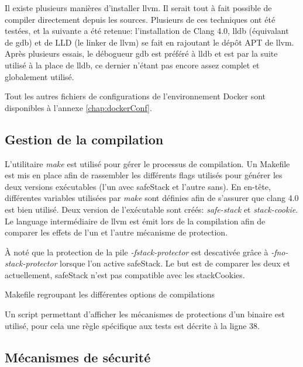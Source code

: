 Il existe plusieurs manières d'installer \gls{llvm}. Il serait tout à fait possible de compiler directement depuis les sources. Plusieurs de ces techniques ont été testées, et la suivante a été retenue: l'installation de Clang 4.0, \gls{lldb} (équivalant de \gls{gdb}) et de LLD (le \og linker \fg de \gls{llvm}) se fait en rajoutant le dépôt APT de \gls{llvm}. Après plusieurs essais, le débogueur \gls{gdb} est préféré à \gls{lldb} et est par la suite utilisé à la place de \gls{lldb}, ce dernier n'étant pas encore assez complet et globalement utilisé.

Tout les autres fichiers de configurations de l'environnement Docker sont disponibles à l'annexe \ref{chap:dockerConf}.

\subsection{Gestion de la compilation}

L'utilitaire \textit{make} est utilisé pour gérer le processus de compilation. Un Makefile est mis en place afin de rassembler les différents \og flags \fg utilisés pour générer les deux versions exécutables (l'un avec \gls{safeStack} et l'autre sans). En en-tête, différentes variables utilisées par \textit{make} sont définies afin de s'assurer que \gls{clang} 4.0 est bien utilisé. Deux version de l'exécutable sont créés: \textit{safe-stack} et \textit{stack-cookie}. Le language intermédiaire de \gls{llvm} est émit lors de la compilation afin de comparer les effets de l'un et l'autre mécanisme de protection.

À noté que la protection de la pile \textit{-fstack-protector} est descativée grâce à \textit{-fno-stack-protector} lorsque l'on active \gls{safeStack}. Le but est de comparer les deux et actuellement, \gls{safeStack} n'est pas compatible avec les \gls{stackCookies}.

\begin{listing}
	\caption{Makefile regroupant les différentes options de compilations}
	\label{lst:defaultMakefile}
\end{listing}

Un script permettant d'afficher les mécanismes de protections d'un binaire est utilisé, pour cela une règle spécifique aux tests est décrite à la ligne 38.

\subsection{Mécanismes de sécurité}

